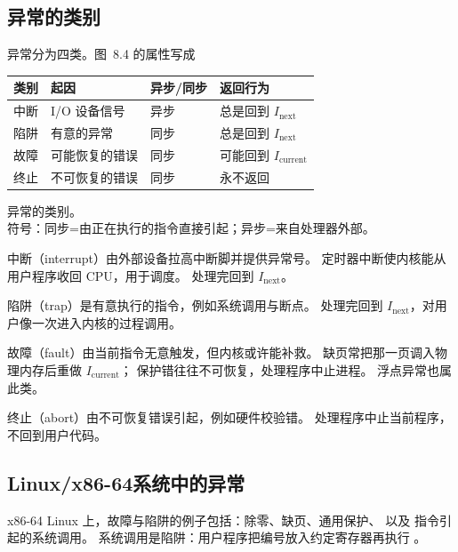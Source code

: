 \subsection{异常的类别}

异常分为四类。图~8.4 的属性写成
\begin{center}
\begin{tabular}{llll}
\toprule
类别 & 起因 & 异步/同步 & 返回行为 \\
\midrule
中断 & I/O 设备信号 & 异步 & 总是回到 $I_{\mathrm{next}}$ \\
陷阱 & 有意的异常 & 同步 & 总是回到 $I_{\mathrm{next}}$ \\
故障 & 可能恢复的错误 & 同步 & 可能回到 $I_{\mathrm{current}}$ \\
终止 & 不可恢复的错误 & 同步 & 永不返回 \\
\bottomrule
\end{tabular}
\end{center}
\quad 异常的类别。\\
符号：同步=由正在执行的指令直接引起；异步=来自处理器外部。

中断（interrupt）由外部设备拉高中断脚并提供异常号。
定时器中断使内核能从用户程序收回 CPU，用于调度。
处理完回到 $I_{\mathrm{next}}$。

陷阱（trap）是有意执行的指令，例如系统调用与断点。
处理完回到 $I_{\mathrm{next}}$，对用户像一次进入内核的过程调用。

故障（fault）由当前指令无意触发，但内核或许能补救。
缺页常把那一页调入物理内存后重做 $I_{\mathrm{current}}$；
保护错往往不可恢复，处理程序中止进程。
浮点异常也属此类。

终止（abort）由不可恢复错误引起，例如硬件校验错。
处理程序中止当前程序，不回到用户代码。

\subsection{Linux/x86-64系统中的异常}

x86-64 Linux 上，故障与陷阱的例子包括：除零、缺页、通用保护、
以及  指令引起的系统调用。
系统调用是陷阱：用户程序把编号放入约定寄存器再执行 。

